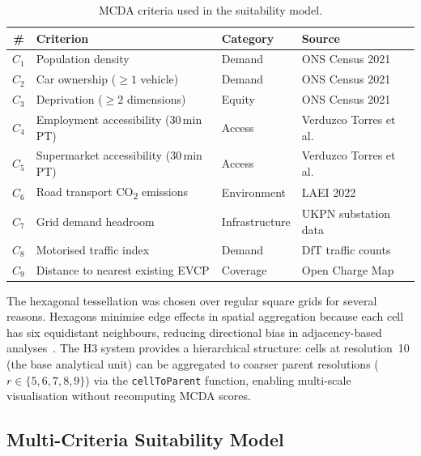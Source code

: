 \begin{table}[htbp]
\centering
\caption{MCDA criteria used in the suitability model.}
\label{tab:criteria}
\small
\begin{tabular}{clll}
\toprule
\textbf{\#} & \textbf{Criterion} & \textbf{Category} & \textbf{Source} \\
\midrule
$C_1$ & Population density & Demand & ONS Census 2021~\cite{ons2021census} \\
$C_2$ & Car ownership ($\geq 1$ vehicle) & Demand & ONS Census 2021~\cite{ons2021census} \\
$C_3$ & Deprivation ($\geq 2$ dimensions) & Equity & ONS Census 2021~\cite{ons2021census} \\
$C_4$ & Employment accessibility (30\,min PT) & Access & Verduzco Torres et al.~\cite{verduzco2024accessibility} \\
$C_5$ & Supermarket accessibility (30\,min PT) & Access & Verduzco Torres et al.~\cite{verduzco2024accessibility} \\
$C_6$ & Road transport CO\textsubscript{2} emissions & Environment & LAEI 2022~\cite{laei2022emissions} \\
$C_7$ & Grid demand headroom & Infrastructure & UKPN substation data \\
$C_8$ & Motorised traffic index & Demand & DfT traffic counts \\
$C_9$ & Distance to nearest existing EVCP & Coverage & Open Charge Map~\cite{openchargemapdata} \\
\bottomrule
\end{tabular}
\end{table}

The hexagonal tessellation was chosen over regular square grids for several reasons. Hexagons minimise edge effects in spatial aggregation because each cell has six equidistant neighbours, reducing directional bias in adjacency-based analyses~\cite{uber2018h3}. The H3 system provides a hierarchical structure: cells at resolution~10 (the base analytical unit) can be aggregated to coarser parent resolutions ($r \in \{5, 6, 7, 8, 9\}$) via the \texttt{cellToParent} function, enabling multi-scale visualisation without recomputing MCDA scores.

\subsection{Multi-Criteria Suitability Model}
\label{sec:mcda-model}

